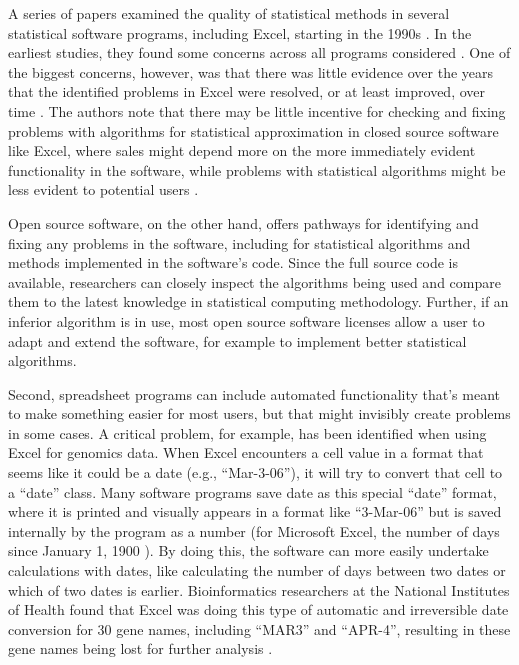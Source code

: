 \documentclass[]{tufte-book}
\begin{document}
A series of papers examined the quality of statistical methods in several
statistical software programs, including Excel, starting in the 1990s
\citep{mccullough1999accuracy, mccullough1999assessing, mccullough2002accuracy, mccullough2005accuracy, mccullough2008accuracy, melard2014accuracy}. In the
earliest studies, they found some concerns across all programs considered
\citep{mccullough1999accuracy, mccullough1999assessing}. One of the biggest
concerns, however, was that there was little evidence over the years that the
identified problems in Excel were resolved, or at least improved, over time
\citep{mccullough2001does, mccullough2008accuracy}. The authors note that there may
be little incentive for checking and fixing problems with algorithms for
statistical approximation in closed source software like Excel, where sales
might depend more on the more immediately evident functionality in the software,
while problems with statistical algorithms might be less evident to potential
users \citep{mccullough2001does}.

Open source software, on the other hand, offers pathways for identifying and fixing
any problems in the software, including for statistical algorithms and methods
implemented in the software's code. Since the full source code is available, researchers
can closely inspect the algorithms being used and compare them to the latest
knowledge in statistical computing methodology. Further, if an inferior algorithm is in
use, most open source software licenses allow a user to adapt and extend the software,
for example to implement better statistical algorithms.

Second, spreadsheet programs can include automated functionality that's meant to
make something easier for most users, but that might invisibly create problems
in some cases. A critical problem, for example, has been identified when using
Excel for genomics data. When Excel encounters a cell value in a format that
seems like it could be a date (e.g., ``Mar-3-06''), it will try to convert that
cell to a ``date'' class. Many software programs save date as this special ``date''
format, where it is printed and visually appears in a format like ``3-Mar-06'' but
is saved internally by the program as a number (for Microsoft Excel, the number
of days since January 1, 1900 \citep{willekens2013chronological}). By doing this, the
software can more easily undertake calculations with dates, like calculating the
number of days between two dates or which of two dates is earlier.
Bioinformatics researchers at the National Institutes of Health found that Excel
was doing this type of automatic and irreversible date conversion for 30 gene
names, including ``MAR3'' and ``APR-4'', resulting in these gene names being lost
for further analysis \citep{zeeberg2004mistaken}.
\end{document}
